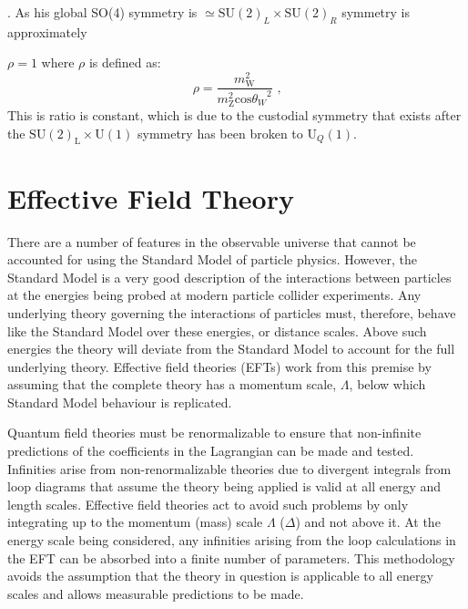 .  As his global SO(4) symmetry is $\simeq \text{SU}(2)_{L} \times \text{SU}(2)_{R} $ symmetry is approximately 

  $\rho = 1$ where $\rho$ is defined as:
%
\begin{equation}
\rho = \frac{m_{\text{W}}^{2}}{m_{\text{Z}}^{2}\text{cos}{\theta_{W}}^{2}} \text{ ,}
\label{equ:custodialsymmetry}
\end{equation}
%
\noindent This is ratio is constant, which is due to the custodial symmetry that exists after the $\text{SU}(2)_{\text{L}} \times \text{U}(1)$ symmetry has been broken to $\text{U}_{Q}(1)$.


\section{Effective Field Theory}
There are a number of features in the observable universe that cannot be accounted for using the Standard Model of particle physics.  However, the Standard Model is a very good description of the interactions between particles at the energies being probed at modern particle collider experiments.  Any underlying theory governing the interactions of particles must, therefore, behave like the Standard Model over these energies, or distance scales.  Above such energies the theory will deviate from the Standard Model to account for the full underlying theory.  Effective field theories (EFTs) work from this premise by assuming that the complete theory  has a momentum scale, $\Lambda$, below which Standard Model behaviour is replicated.  

Quantum field theories must be renormalizable to ensure that non-infinite predictions of the coefficients in the Lagrangian can be made and tested.  Infinities arise from non-renormalizable theories due to divergent integrals from loop diagrams that assume the theory being applied is valid at all energy and length scales.  Effective field theories act to avoid such problems by only integrating up to the momentum (mass) scale $\Lambda$ ($\Delta$) and not above it.  At the energy scale being considered, any infinities arising from the loop calculations in the EFT can be absorbed into a finite number of parameters.  This methodology avoids the assumption that the theory in question is applicable to all energy scales and allows measurable predictions to be made.  

